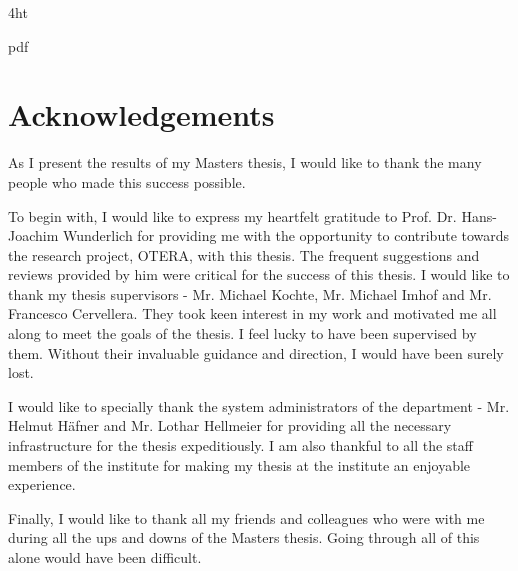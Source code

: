 \documentclass[
               paper=a4,
               BCOR1.92mm,DIV12,headinclude, %
               titlepage,
               bibliography=totoc,
               headsepline,
               cleardoublepage=empty,
               parskip=half,
	       pointlessnumbers, %
               final   %
               ]{scrreprt}
\begin{document}
\iftex4ht
\Configure{$}{\PicMath}{\EndPicMath}{} 

         {pdf}  
         {%
         }  
\fi

%
%





\VerbatimFootnotes %


\pagestyle{preamble}
\renewcommand*{\chapterpagestyle}{preamble}

\chapter*{Acknowledgements}
\begin{spacing}{1.5} 
As I present the results of my Masters thesis, I would like to thank the many people who made this success possible.

To begin with, I would like to express my heartfelt gratitude to Prof. Dr. Hans-Joachim Wunderlich for providing me with the opportunity to contribute towards the research project, OTERA, with this thesis. The frequent suggestions and reviews provided by him were critical for the success of this thesis. I would like to thank my thesis supervisors - Mr. Michael Kochte, Mr. Michael Imhof and Mr. Francesco Cervellera. They took keen interest in my work and motivated me all along to meet the goals of the thesis. I feel lucky to have been supervised by them. Without their invaluable guidance and direction, I would have been surely lost.

I would like to specially thank the system administrators of the department - Mr.  Helmut Häfner  and Mr. Lothar Hellmeier for providing all the necessary infrastructure for the thesis expeditiously. I am also thankful to all the staff members of the institute for making my thesis at the institute an enjoyable experience.

Finally, I would like to thank all my friends and colleagues who were with me during all the ups and downs of the Masters thesis. Going through all of this alone would have been difficult.
\end{spacing}
\end{document}
